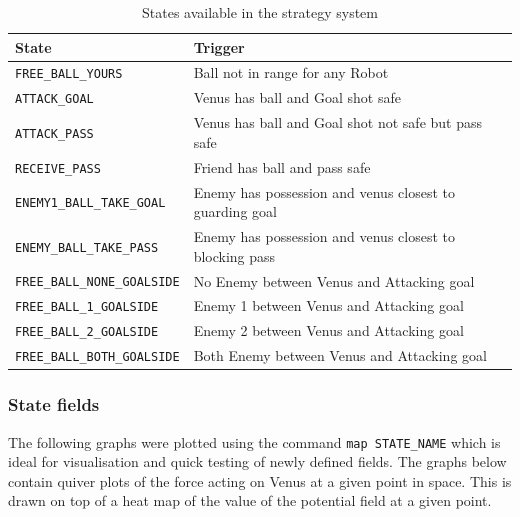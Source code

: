 \documentclass[a4paper,12pt]{article}
\begin{document}
\begin{table}[h!]
\centering
\begin{tabular}{ | l | l | }
\hline
\textbf{State} & \textbf{Trigger} \\ \hline
\texttt{FREE\_BALL\_YOURS} & Ball not in range for any Robot\\ \hline
\texttt{ATTACK\_GOAL} &   Venus has ball and Goal shot safe \\ \hline
\texttt{ATTACK\_PASS} &  Venus has ball and Goal shot not safe but pass safe\\ \hline
\texttt{RECEIVE\_PASS} &  Friend has ball and pass safe\\ \hline
\texttt{ENEMY1\_BALL\_TAKE\_GOAL} &  Enemy has possession and venus closest to guarding goal\\ \hline
\texttt{ENEMY\_BALL\_TAKE\_PASS} &  Enemy has possession and venus closest to blocking pass\\ \hline
\texttt{FREE\_BALL\_NONE\_GOALSIDE} & No Enemy between Venus and Attacking goal \\ \hline
\texttt{FREE\_BALL\_1\_GOALSIDE} & Enemy 1 between Venus and Attacking goal \\ \hline
\texttt{FREE\_BALL\_2\_GOALSIDE} & Enemy 2 between Venus and Attacking goal \\ \hline
\texttt{FREE\_BALL\_BOTH\_GOALSIDE} &  Both Enemy between Venus and Attacking goal\\ \hline

\end{tabular}
\caption{States available in the strategy system}
\label{tab:machine}
\end{table}

\subsubsection{State fields}

The following graphs were plotted using the command \texttt{map STATE\_NAME} which is ideal for visualisation and quick testing of newly defined fields. The graphs below contain quiver plots of the force acting on Venus at a given point in space. This is drawn on top of a heat map of the value of the potential field at a given point. 
\end{document}
